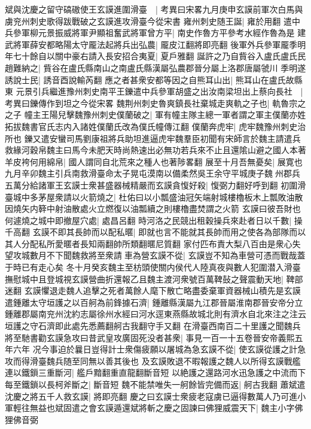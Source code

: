 斌與沈慶之留守碻磝使王玄謨進圍滑臺　|{
	考異曰宋畧九月庚申玄謨前軍次白馬與虜兖州刺史歌得跋戰破之玄謨進攻滑臺今從宋書}
雍州刺史随王誕|{
	雍於用翻}
遣中兵參軍柳元景振威將軍尹顯祖奮武將軍曾方平|{
	南史作魯方平參考水經作魯為是}
建武將軍薛安都略陽太守龎法起將兵出弘農|{
	龎皮江翻將即亮翻}
後軍外兵參軍龎季明年七十餘自以關中豪右請入長安招合夷夏|{
	夏戶雅翻}
誕許之乃自貲谷入盧氏盧氏民趙難納之|{
	貲谷在盧氏縣南山之南盧氏縣漢屬弘農郡晉分屬上洛郡唐屬虢川}
季明遂誘說士民|{
	誘音酉說輸芮翻}
應之者甚衆安都等因之自熊耳山出|{
	熊耳山在盧氏故縣東}
元景引兵繼進豫州刺史南平王鑠遣中兵參軍胡盛之出汝南梁坦出上蔡向長社　|{
	考異曰鑠傳作到坦之今從宋畧}
魏荆州刺史魯爽鎮長社棄城走爽軌之子也|{
	軌魯宗之之子}
幢主王陽兒擊魏豫州刺史僕蘭破之|{
	軍有幢主隊主總一軍者謂之軍主僕蘭亦姓拓拔魏書官氏志内入諸姓僕蘭氏改為僕氏幢傳江翻}
僕蘭奔虎牢|{
	虎牢魏豫州刺史治所也}
鑠又遣安蠻司馬劉康祖將兵助坦進逼虎牢魏羣臣初聞有宋師言於魏主請遣兵救緣河穀帛魏主曰馬今未肥天時尚熱速出必無功若兵來不止且還隂山避之國人本著羊皮袴何用綿帛|{
	國人謂同自北荒來之種人也著陟畧翻}
展至十月吾無憂矣|{
	展寛也}
九月辛卯魏主引兵南救滑臺命太子晃屯漠南以備柔然吳王余守平城庚子魏州郡兵五萬分給諸軍王玄謨士衆甚盛器械精嚴而玄謨貪愎好殺|{
	愎弼力翻好呼到翻}
初圍滑臺城中多茅屋衆請以火箭燒之|{
	杜佑曰以小瓢盛油冠矢端射城樓櫓板木上瓢敗油散因燒矢内簳中射油散處火立燃復以油瓢續之則樓櫓盡焚謂之火箭}
玄謨曰彼吾財也何遽燒之城中即撤屋穴處|{
	處昌呂翻}
時河洛之民競出租穀操兵來赴者日以千數|{
	操千高翻}
玄謨不即其長帥而以配私暱|{
	即就也言不能就其長帥而用之使各為部隊而以其人分配私所愛暱者長知兩翻帥所類翻暱尼質翻}
家付匹布責大梨八百由是衆心失望攻城數月不下聞魏救將至衆請車為營玄謨不從|{
	玄謨豈不知為車營可憑而戰哉蓋于時已有走心矣}
冬十月癸亥魏主至枋頭使關内侯代人陸真夜與數人犯圍潜入滑臺撫慰城中且登城視玄謨營曲折還報乙且魏主渡河衆號百萬鞞鼔之聲震動天地|{
	鞞部迷翻}
玄謨懼退走魏人追擊之死者萬餘人麾下散亡略盡委棄軍資器械山積先是玄謨遣鍾離太守垣護之以百舸為前鋒據石濟|{
	鍾離縣漢屬九江郡晉屬淮南郡晉安帝分立鍾離郡屬南兖州沈約志屬徐州水經曰河水逕東燕縣故城北則有濟水自北來注之注云垣護之守石濟即此處先悉薦翻舸古我翻守手又翻}
在滑臺西南百二十里護之聞魏兵將至馳書勸玄謨急攻曰昔武皇攻廣固死没者甚衆|{
	事見一百一十五卷晉安帝義熙五年六年}
况今事迫於曩日豈得計士衆傷疲願以屠城為急玄謨不從|{
	使玄謨從護之計急攻而得滑臺魏兵随至同無以善其後也}
及玄謨敗退不暇報護之魏人以所得玄謨戰艦連以鐵鎻三重斷河|{
	艦戶黯翻重直龍翻斷音短}
以絶護之還路河水迅急護之中流而下每至鐵鎖以長柯斧斷之|{
	斷音短}
魏不能禁唯失一舸餘皆完備而返|{
	舸古我翻}
蕭斌遣沈慶之將五千人救玄謨|{
	將即亮翻}
慶之曰玄謨士衆疲老寇虜已逼得數萬人乃可進小軍輕往無益也斌固遣之會玄謨遁還斌將斬之慶之固諫曰佛狸威震天下|{
	魏主小字佛狸佛音弼}
